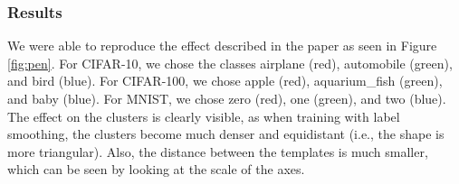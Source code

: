 
\subsubsection{Results}
We were able to reproduce the effect described in the paper as seen in Figure \ref{fig:pen}. For CIFAR-10, we chose the classes airplane ({\color{pl_red}red}), automobile ({\color{pl_green}green}), and bird ({\color{pl_blue}blue}). For CIFAR-100, we chose apple ({\color{pl_red}red}), aquarium\_fish ({\color{pl_green}green}), and baby ({\color{pl_blue}blue}). For MNIST, we chose zero ({\color{pl_red}red}), one ({\color{pl_green}green}), and two ({\color{pl_blue}blue}). The effect on the clusters is clearly visible, as when training with label smoothing, the clusters become much denser and equidistant (i.e., the shape is more triangular). Also, the distance between the templates is much smaller, which can be seen by looking at the scale of the axes.


